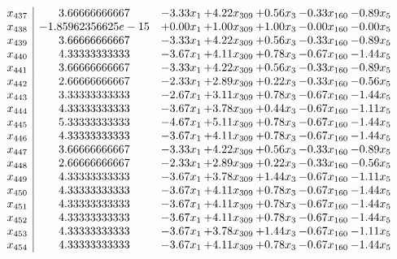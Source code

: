 \documentclass[8pt]{article}
\begin{document}
\[\begin{array}{c| c c@{\hskip 2pt} c@{\hskip 2pt} c@{\hskip 2pt} c@{\hskip 2pt} c@{\hskip 2pt} }
 x_{437}   &  3.66666666667 & -3.33 x_{1} & +  4.22 x_{309} & +  0.56 x_{3} & -0.33 x_{160} & -0.89 x_{5}\\
 x_{438}   &  -1.85962356625e-15 & +  0.00 x_{1} & +  1.00 x_{309} & +  1.00 x_{3} & -0.00 x_{160} & -0.00 x_{5}\\
 x_{439}   &  3.66666666667 & -3.33 x_{1} & +  4.22 x_{309} & +  0.56 x_{3} & -0.33 x_{160} & -0.89 x_{5}\\
 x_{440}   &  4.33333333333 & -3.67 x_{1} & +  4.11 x_{309} & +  0.78 x_{3} & -0.67 x_{160} & -1.44 x_{5}\\
 x_{441}   &  3.66666666667 & -3.33 x_{1} & +  4.22 x_{309} & +  0.56 x_{3} & -0.33 x_{160} & -0.89 x_{5}\\
 x_{442}   &  2.66666666667 & -2.33 x_{1} & +  2.89 x_{309} & +  0.22 x_{3} & -0.33 x_{160} & -0.56 x_{5}\\
 x_{443}   &  3.33333333333 & -2.67 x_{1} & +  3.11 x_{309} & +  0.78 x_{3} & -0.67 x_{160} & -1.44 x_{5}\\
 x_{444}   &  4.33333333333 & -3.67 x_{1} & +  3.78 x_{309} & +  0.44 x_{3} & -0.67 x_{160} & -1.11 x_{5}\\
 x_{445}   &  5.33333333333 & -4.67 x_{1} & +  5.11 x_{309} & +  0.78 x_{3} & -0.67 x_{160} & -1.44 x_{5}\\
 x_{446}   &  4.33333333333 & -3.67 x_{1} & +  4.11 x_{309} & +  0.78 x_{3} & -0.67 x_{160} & -1.44 x_{5}\\
 x_{447}   &  3.66666666667 & -3.33 x_{1} & +  4.22 x_{309} & +  0.56 x_{3} & -0.33 x_{160} & -0.89 x_{5}\\
 x_{448}   &  2.66666666667 & -2.33 x_{1} & +  2.89 x_{309} & +  0.22 x_{3} & -0.33 x_{160} & -0.56 x_{5}\\
 x_{449}   &  4.33333333333 & -3.67 x_{1} & +  3.78 x_{309} & +  1.44 x_{3} & -0.67 x_{160} & -1.11 x_{5}\\
 x_{450}   &  4.33333333333 & -3.67 x_{1} & +  4.11 x_{309} & +  0.78 x_{3} & -0.67 x_{160} & -1.44 x_{5}\\
 x_{451}   &  4.33333333333 & -3.67 x_{1} & +  4.11 x_{309} & +  0.78 x_{3} & -0.67 x_{160} & -1.44 x_{5}\\
 x_{452}   &  4.33333333333 & -3.67 x_{1} & +  4.11 x_{309} & +  0.78 x_{3} & -0.67 x_{160} & -1.44 x_{5}\\
 x_{453}   &  4.33333333333 & -3.67 x_{1} & +  3.78 x_{309} & +  1.44 x_{3} & -0.67 x_{160} & -1.11 x_{5}\\
 x_{454}   &  4.33333333333 & -3.67 x_{1} & +  4.11 x_{309} & +  0.78 x_{3} & -0.67 x_{160} & -1.44 x_{5}\\

\end{array}\]
\end{document}
